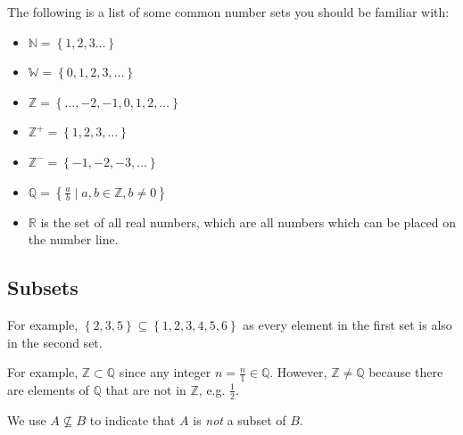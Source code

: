 \documentclass[11pt,a4paper]{book}
\newcommand{\R}{\mathbb{R}}
\newcommand{\N}{\mathbb{N}}
\newcommand{\Z}{\mathbb{Z}}
\newcommand{\Q}{\mathbb{Q}}
\newcommand{\W}{\mathbb{W}}
\begin{document}
The following is a list of some common number sets you should be familiar
with:
\begin{itemize}
\item $\N=\left\{ 1,2,3\ldots\right\} $
\item $\W=\left\{ 0,1,2,3,\ldots\right\} $
\item $\Z=\left\{ \ldots,-2,-1,0,1,2,\ldots\right\} $
\item $\Z^{+}=\left\{ 1,2,3,\ldots\right\} $
\item $\Z^{-}=\left\{ -1,-2,-3,\ldots\right\} $
\item ${\displaystyle \Q=\left\{ \frac{a}{b}\mid a,b\in\Z,b\neq0\right\} }$
\item $\R$ is the set of all real numbers, which are all numbers which
can be placed on the number line.
\end{itemize}

\newpage

\subsection{Subsets}
\begin{center}
\par\end{center}

For example, $\left\{ 2,3,5\right\} \subseteq\left\{ 1,2,3,4,5,6\right\} $
as every element in the first set is also in the second set.
\begin{center}
\par\end{center}

For example, $\Z\subset\Q$ since any integer ${\displaystyle n=\frac{n}{1}\in\Q}$.
However, $\Z\neq\Q$ because there are elements of $\Q$ that are
not in $\Z$, e.g. ${\displaystyle \frac{1}{2}}$.

We use $A\not\subseteq B$ to indicate that $A$ is \textit{not} a
subset of $B$.
\end{document}
